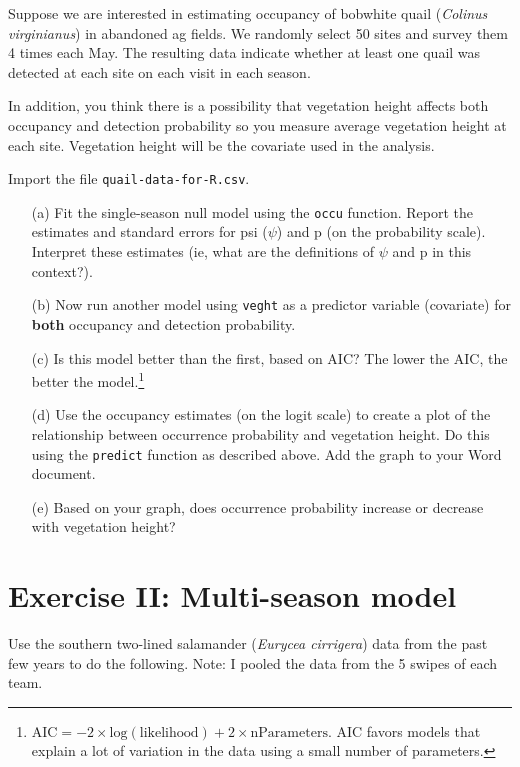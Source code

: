 \documentclass[12pt]{article}\usepackage[]{graphicx}\usepackage[]{color}
\begin{document}
Suppose we are interested in estimating occupancy of bobwhite quail
({\it Colinus virginianus}) in abandoned ag fields. We randomly select
50 sites and survey them 4 times each May. The resulting data indicate
whether at least one quail was detected at each site on each visit in
each season.    

In addition, you think there is a possibility that vegetation height
affects both occupancy and detection probability so you measure
average vegetation height at each site. Vegetation height will be the
covariate used in the analysis. 

Import the file {\tt quail-data-for-R.csv}.

\begin{enumerate}
  \item[(a)] Fit the single-season null model using the \texttt{occu} 
    function. Report the estimates and standard errors for psi
    ($\psi$) and p (on the probability scale). Interpret 
    these estimates (ie, what are the definitions of $\psi$ and p in this
    context?). 
  \item[(b)] Now run another model using \texttt{veght} as a
    predictor variable (covariate) for {\bf both} occupancy and detection
    probability. 
  \item[(c)] Is this model better than the first, based on AIC? The
    lower the AIC, the better the model.\footnote{$\mathrm{AIC} =
      -2\times \mathrm{log(likelihood)} + 2\times \mathrm{nParameters}$. AIC
      favors models that explain a lot of variation in the data using
      a small number of parameters.}  
  \item[(d)] Use the occupancy estimates (on the logit scale) to
    create a plot of the relationship between occurrence probability
    and vegetation height. Do this using the \texttt{predict} function
    as described above. Add the graph to your Word document.
  \item[(e)] Based on your graph, does occurrence probability
    increase or decrease with vegetation height?  
\end{enumerate}

\clearpage

\section*{Exercise II: Multi-season model}

Use the southern two-lined salamander ({\it Eurycea cirrigera})
data from the past few years to do the following. Note: I pooled the
data from the 5 swipes of each team.
\end{document}
